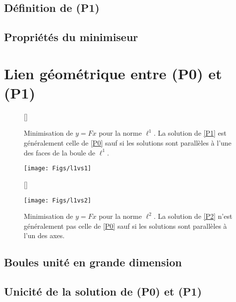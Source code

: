 \subsection{Définition de (P1)}
\subsection{Propriétés du minimiseur}

\section{Lien géométrique entre (P0) et (P1)}
\begin{figure}[h]
	[\FBwidth]
	{\caption{Minimisation de $y=Fx$ pour la norme $\ell^1$. La solution de \ref{P1} est généralement celle de \ref{P0} sauf si les solutions sont parallèles à l'une des faces de la boule de $\ell^1$.}}
	{\texttt{[image: Figs/l1vs1]}}
	
	[\FBwidth]
	{\caption{Minimisation de $y=Fx$ pour la norme $\ell^2$. La solution de \ref{P2} n'est généralement pas celle de \ref{P0} sauf si les solutions sont parallèles à l'un des axes.}}
	{\texttt{[image: Figs/l1vs2]}}
	
	\end{figure}

\subsection{Boules unité en grande dimension}
\subsection{Unicité de la solution de (P0) et (P1)}


